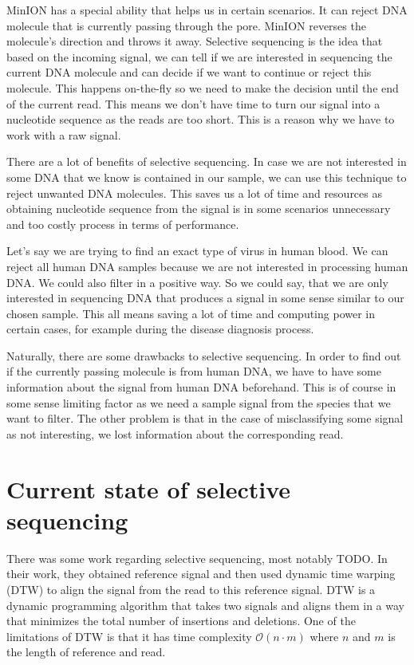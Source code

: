 MinION has a special ability that helps us in certain scenarios. It can reject
DNA molecule that is currently passing through the pore. MinION reverses the molecule’s direction and throws it away.
Selective sequencing is the idea that based on the incoming signal, we can tell
if we are interested in sequencing the current DNA molecule and can decide if we want
to continue or reject this molecule. This happens on-the-fly so we need to make
the decision until the end of the current read. This means we don't have time to
turn our signal into a nucleotide sequence as the reads are too short. This is
a reason why we have to work with a raw signal.

There are a lot of benefits of selective sequencing. In case we are not interested
in some DNA that we know is contained in our sample, we can use this technique to
reject unwanted DNA molecules. This saves us a lot of time and resources as obtaining
nucleotide sequence from the signal is in some scenarios unnecessary and too
costly process in terms of performance.

Let's say we are trying to find an exact type of virus in human blood. We can
reject all human DNA samples because we are not interested in processing human
DNA. We could also filter in a positive way. So we could say, that we are only
interested in sequencing DNA that produces a signal in some sense similar to our
chosen sample. This all means saving a lot of time and computing power in certain
cases, for example during the disease diagnosis process.

Naturally, there are some drawbacks to selective sequencing. In order to find out
if the currently passing molecule is from human DNA, we have to have some information
about the signal from human DNA beforehand.
This is of course in some sense limiting factor as we need a sample signal from
the species that we want to filter. The other problem is that in the case of misclassifying
some signal as not interesting, we lost information about the corresponding
read.

\section{Current state of selective sequencing}


There was some work regarding selective sequencing, most notably TODO. In their
work, they obtained reference signal and then used dynamic time warping (DTW) to
align the signal from the read to this reference signal. DTW is a dynamic programming
algorithm that takes two signals and aligns them in a way that minimizes the total
number of insertions and deletions. One of the limitations of DTW is that it has
time complexity $\mathcal{O}(n\cdot m)$ where $n$ and $m$ is the length of reference and read.
